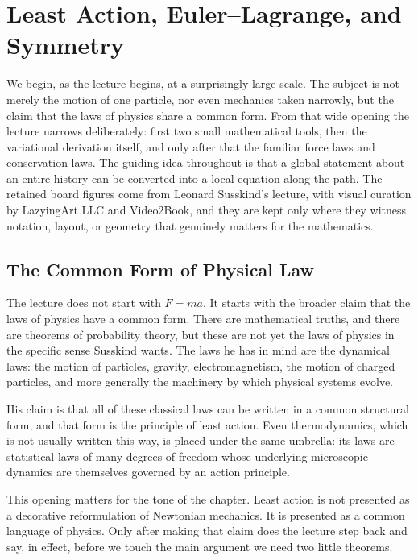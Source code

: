 \chapter{Least Action, Euler--Lagrange, and Symmetry}

We begin, as the lecture begins, at a surprisingly large scale. The subject is not merely the motion of one particle, nor even mechanics taken narrowly, but the claim that the laws of physics share a common form. From that wide opening the lecture narrows deliberately: first two small mathematical tools, then the variational derivation itself, and only after that the familiar force laws and conservation laws. The guiding idea throughout is that a global statement about an entire history can be converted into a local equation along the path. The retained board figures come from Leonard Susskind's lecture, with visual curation by LazyingArt LLC and Video2Book, and they are kept only where they witness notation, layout, or geometry that genuinely matters for the mathematics.

\section{The Common Form of Physical Law}

The lecture does not start with \(F=ma\). It starts with the broader claim that the laws of physics have a common form. There are mathematical truths, and there are theorems of probability theory, but these are not yet the laws of physics in the specific sense Susskind wants. The laws he has in mind are the dynamical laws: the motion of particles, gravity, electromagnetism, the motion of charged particles, and more generally the machinery by which physical systems evolve.

His claim is that all of these classical laws can be written in a common structural form, and that form is the principle of least action. Even thermodynamics, which is not usually written this way, is placed under the same umbrella: its laws are statistical laws of many degrees of freedom whose underlying microscopic dynamics are themselves governed by an action principle.

This opening matters for the tone of the chapter. Least action is not presented as a decorative reformulation of Newtonian mechanics. It is presented as a common language of physics. Only after making that claim does the lecture step back and say, in effect, before we touch the main argument we need two little theorems.

